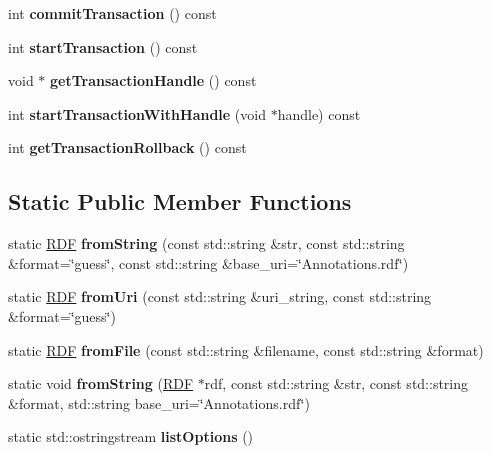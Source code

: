 \begin{DoxyCompactItemize}
int {\bfseries commit\+Transaction} () const
\item 
\mbox{\label{classomexmeta_1_1RDF_afa2b148ecb235b3ac9497fa3b528d2ed}} 
int {\bfseries start\+Transaction} () const
\item 
\mbox{\label{classomexmeta_1_1RDF_ad30bbe5c9b274713f87d4d4a5f2b28e9}} 
void $\ast$ {\bfseries get\+Transaction\+Handle} () const
\item 
\mbox{\label{classomexmeta_1_1RDF_a278b78d5b1b88397c2eb4143f23dab8b}} 
int {\bfseries start\+Transaction\+With\+Handle} (void $\ast$handle) const
\item 
\mbox{\label{classomexmeta_1_1RDF_af5c7c6104496c09762518d56e94e6048}} 
int {\bfseries get\+Transaction\+Rollback} () const
\end{DoxyCompactItemize}
\subsection*{Static Public Member Functions}
\begin{DoxyCompactItemize}
\item 
\mbox{\label{classomexmeta_1_1RDF_ac446d196004562580ed211552f12f161}} 
static \hyperlink{classomexmeta_1_1RDF}{R\+DF} {\bfseries from\+String} (const std\+::string \&str, const std\+::string \&format=\char`\"{}guess\char`\"{}, const std\+::string \&base\+\_\+uri=\char`\"{}Annotations.\+rdf\char`\"{})
\item 
\mbox{\label{classomexmeta_1_1RDF_a03906aa5c3b9429a2afdbe0ad2be21e6}} 
static \hyperlink{classomexmeta_1_1RDF}{R\+DF} {\bfseries from\+Uri} (const std\+::string \&uri\+\_\+string, const std\+::string \&format=\char`\"{}guess\char`\"{})
\item 
\mbox{\label{classomexmeta_1_1RDF_a98a1da84161a7935bf38ec5e5d34e91f}} 
static \hyperlink{classomexmeta_1_1RDF}{R\+DF} {\bfseries from\+File} (const std\+::string \&filename, const std\+::string \&format)
\item 
\mbox{\label{classomexmeta_1_1RDF_ab2dadc7ff1cf25edbb401b2c879a21b0}} 
static void {\bfseries from\+String} (\hyperlink{classomexmeta_1_1RDF}{R\+DF} $\ast$rdf, const std\+::string \&str, const std\+::string \&format, std\+::string base\+\_\+uri=\char`\"{}Annotations.\+rdf\char`\"{})
\item 
\mbox{\label{classomexmeta_1_1RDF_ae01ed260e02eda2141ffe1288f78c177}} 
static std\+::ostringstream {\bfseries list\+Options} ()
\end{DoxyCompactItemize}
